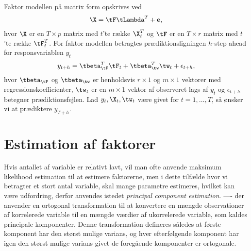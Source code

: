 Faktor modellen på matrix form opskrives ved
\begin{align*}
\X = \tF \tLambda^T + \mathbf{e},
\end{align*}
hvor \(\X\) er en \(T \times p\) matrix med \(t\)'te række \(\X_t^T\) og \(\tF\) er en \(T \times r\) matrix med \(t\)'te række \(\tF_t^T\).
For faktor modellen betragtes prædiktionsligningen \(h\)-step ahead for responsvariablen \(y_t\)
\begin{align}
y_{t+h} = \tbeta_{\tF}^T \tF_t + \tbeta_{\tw}^T \tw_t + \epsilon_{t+h}, \label{eq:factor_model_forecast}
\end{align}
hvor \(\tbeta_{\tF}\) og \(\tbeta_{\tw}\) er henholdsvis \(r \times 1\) og \(m \times 1\) vektorer med regressionskoefficienter, \(\tw_t\) er en \(m \times 1\) vektor af observeret lags af \(y_t\) og \(\epsilon_{t+h}\) betegner prædiktionsfejlen.
Lad \(y_t, \X_t, \tw_t\) være givet for \(t = 1, \ldots, T\), så ønsker vi at prædiktere \(y_{T+h}\).

\section{Estimation af faktorer}
Hvis antallet af variable er relativt lavt, vil man ofte anvende maksimum likelihood estimation til at estimere faktorerne, men i dette tilfælde hvor vi betragter et stort antal variable, skal mange parametre estimeres, hvilket kan være udfordring, derfor anvendes istedet \textit{principal component estimation}.
----
 der anvender en ortogonal transformation til at konvertere en mængde observationer af korrelerede variable til en mængde værdier af ukorrelerede variable, som kaldes principale komponenter.
Denne transformation defineres således at første komponent har den størst mulige varians, og hver efterfølgende komponent har igen den størst mulige varians givet de foregående komponenter er ortogonale.

